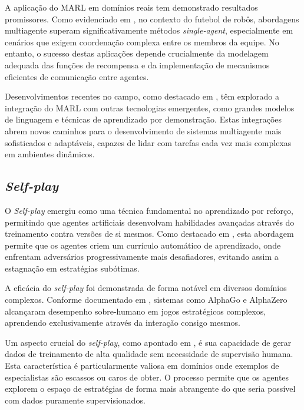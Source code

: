 A aplicação do MARL em domínios reais tem demonstrado resultados promissores. Como evidenciado em \cite{martins_vss}, no contexto do futebol de robôs, abordagens multiagente superam significativamente métodos \textit{single-agent}, especialmente em cenários que exigem coordenação complexa entre os membros da equipe. No entanto, o sucesso destas aplicações depende crucialmente da modelagem adequada das funções de recompensa e da implementação de mecanismos eficientes de comunicação entre agentes.

Desenvolvimentos recentes no campo, como destacado em \cite{survey_multi_agent}, têm explorado a integração do MARL com outras tecnologias emergentes, como grandes modelos de linguagem e técnicas de aprendizado por demonstração. Estas integrações abrem novos caminhos para o desenvolvimento de sistemas multiagente mais sofisticados e adaptáveis, capazes de lidar com tarefas cada vez mais complexas em ambientes dinâmicos.

\subsection{\textit{Self-play}}
\label{subsec:self_play}

O \textit{Self-play} emergiu como uma técnica fundamental no aprendizado por reforço, permitindo que agentes artificiais desenvolvam habilidades avançadas através do treinamento contra versões de si mesmos. Como destacado em \cite{survey_self_play}, esta abordagem permite que os agentes criem um currículo automático de aprendizado, onde enfrentam adversários progressivamente mais desafiadores, evitando assim a estagnação em estratégias subótimas.

A eficácia do \textit{self-play} foi demonstrada de forma notável em diversos domínios complexos. Conforme documentado em \cite{alpha_zero}, sistemas como AlphaGo e AlphaZero alcançaram desempenho sobre-humano em jogos estratégicos complexos, aprendendo exclusivamente através da interação consigo mesmos.

Um aspecto crucial do \textit{self-play}, como apontado em \cite{survey_self_play_2024}, é sua capacidade de gerar dados de treinamento de alta qualidade sem necessidade de supervisão humana. Esta característica é particularmente valiosa em domínios onde exemplos de especialistas são escassos ou caros de obter. O processo permite que os agentes explorem o espaço de estratégias de forma mais abrangente do que seria possível com dados puramente supervisionados.

